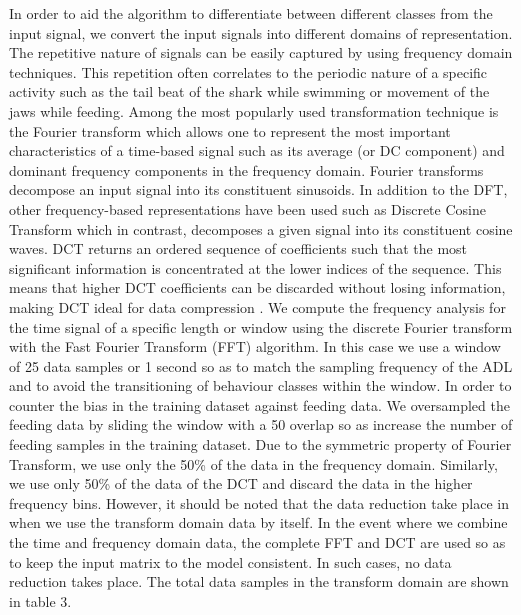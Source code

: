 \documentclass[conference]{IEEEtran}
\begin{document}

In order to aid the algorithm to differentiate between different classes from the input signal, we convert the input signals into different domains of representation. The repetitive nature of signals can be easily captured by using frequency domain techniques. This repetition often correlates to the periodic nature of a specific activity such as the tail beat of the shark while swimming or movement of the jaws while feeding. Among the most popularly used transformation technique is the Fourier transform which allows one to represent the most important characteristics of a time-based signal such as its average (or DC component) and dominant frequency components in the frequency domain. Fourier transforms decompose an input signal into its constituent sinusoids.  In addition to the DFT, other frequency-based representations have been used such as Discrete Cosine Transform which in contrast, decomposes a given signal into its constituent cosine waves. DCT returns an ordered sequence of coefficients such that the most significant information is concentrated at the lower indices of the sequence.  This means that higher DCT coefficients can be discarded without losing information, making DCT ideal for data compression \cite{15}.
We compute the frequency analysis for the time signal of a specific length or window using the discrete Fourier transform with the Fast Fourier Transform (FFT) algorithm. In this case we use a window of 25 data samples or 1 second so as to match the sampling frequency of the ADL and to avoid the transitioning of behaviour classes within the window. In order to counter the bias in the training dataset against feeding data. We oversampled the feeding data by sliding the window with a 50 overlap \cite{16} so as increase the number of feeding samples in the training dataset. Due to the symmetric property of Fourier Transform, we use only the 50\% of the data in the frequency domain. Similarly, we use only 50\% of the data of the DCT and discard the data in the higher frequency bins. However, it should be noted that the data reduction take place in when we use the transform domain data by itself. In the event where we combine the time and frequency domain data, the complete FFT and DCT are used so as to keep the input matrix to the model consistent. In such cases, no data reduction takes place. The total data samples in the transform domain are shown in table 3.
\end{document}

